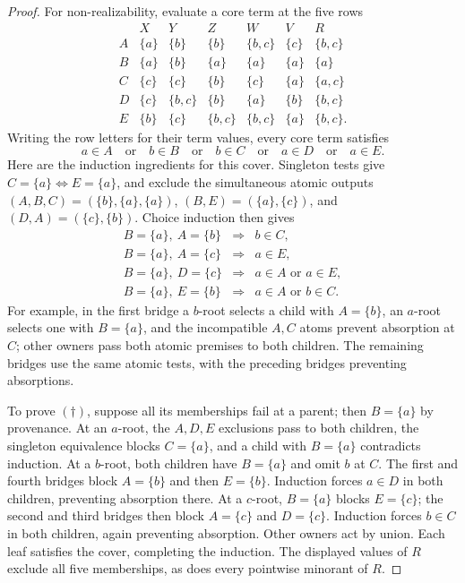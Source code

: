 \begin{proof}
For non-realizability, evaluate a core term at the five rows
\[
\begin{array}{c|ccccc|c}
 &X&Y&Z&W&V&R\\\hline
 A&\{a\}&\{b\}&\{b\}&\{b,c\}&\{c\}&\{b,c\}\\
 B&\{a\}&\{b\}&\{a\}&\{a\}&\{a\}&\{a\}\\
 C&\{c\}&\{c\}&\{b\}&\{c\}&\{a\}&\{a,c\}\\
 D&\{c\}&\{b,c\}&\{b\}&\{a\}&\{b\}&\{b,c\}\\
 E&\{b\}&\{c\}&\{b,c\}&\{b,c\}&\{a\}&\{b,c\}.
\end{array}
\]
Writing the row letters for their term values, every core term satisfies
\[
 a\in A\quad\text{or}\quad b\in B\quad\text{or}\quad b\in C
 \quad\text{or}\quad a\in D\quad\text{or}\quad a\in E.       \tag{$\dagger$}
\]
Here are the induction ingredients for this cover. Singleton tests give
$C=\{a\}\iff E=\{a\}$, and exclude the simultaneous atomic outputs
$(A,B,C)=(\{b\},\{a\},\{a\})$,
$(B,E)=(\{a\},\{c\})$, and $(D,A)=(\{c\},\{b\})$.
Choice induction then gives
\[
\begin{array}{rcl}
 B=\{a\},\ A=\{b\}&\Longrightarrow&b\in C,\\
 B=\{a\},\ A=\{c\}&\Longrightarrow&a\in E,\\
 B=\{a\},\ D=\{c\}&\Longrightarrow&a\in A\text{ or }a\in E,\\
 B=\{a\},\ E=\{b\}&\Longrightarrow&a\in A\text{ or }b\in C.
\end{array}
\]
For example, in the first bridge a $b$-root selects a child with
$A=\{b\}$, an $a$-root selects one with $B=\{a\}$, and the
incompatible $A,C$ atoms prevent absorption at $C$; other owners pass
both atomic premises to both children. The remaining bridges use the
same atomic tests, with the preceding bridges preventing absorptions.

To prove $(\dagger)$, suppose all its memberships fail at a parent;
then $B=\{a\}$ by provenance. At an $a$-root, the $A,D,E$ exclusions
pass to both children, the singleton equivalence blocks $C=\{a\}$,
and a child with $B=\{a\}$ contradicts induction.
At a $b$-root, both children have $B=\{a\}$ and omit $b$ at $C$.
The first and fourth bridges block $A=\{b\}$ and then $E=\{b\}$.
Induction forces $a\in D$ in both children, preventing absorption there.
At a $c$-root, $B=\{a\}$ blocks $E=\{c\}$; the second and third
bridges then block $A=\{c\}$ and $D=\{c\}$. Induction forces
$b\in C$ in both children, again preventing absorption. Other owners
act by union. Each leaf satisfies the cover, completing the induction.
The displayed values of $R$ exclude all five memberships, as does every
pointwise minorant of $R$.
\end{proof}

